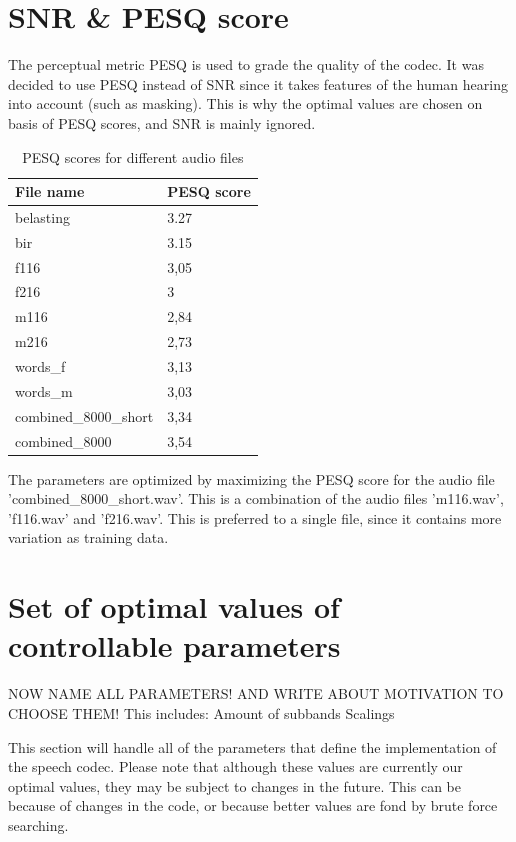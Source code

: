 \documentclass[a4paper]{article}
\begin{document}
\section{SNR \& PESQ score}
The perceptual metric PESQ is used to grade the quality of the codec. It was decided to use PESQ instead of SNR since it takes features of the human hearing into account (such as masking). This is why the optimal values are chosen on basis of PESQ scores, and SNR is mainly ignored. \\

\begin{table}[bth]
\begin{center}
\begin{tabular}{ |l|l| }
  \hline
  File name & PESQ score \\
  \hline
  belasting & 3.27 \\
  bir & 3.15 \\
  f116 & 3,05 \\
  f216 & 3 \\
  m116 & 2,84 \\
  m216 & 2,73 \\
  words\_f & 3,13 \\
  words\_m & 3,03 \\
  combined\_8000\_short & 3,34 \\
  combined\_8000 & 3,54 \\
  \hline
\end{tabular}
  \caption{PESQ scores for different audio files}
\label{fig:pesqscores}

\end{center}
\end{table}

The parameters are optimized by maximizing the PESQ score for the audio file 'combined\_8000\_short.wav'. This is a combination of the audio files 'm116.wav', 'f116.wav' and 'f216.wav'. This is preferred to a single file, since it contains more variation as training data.

\section{Set of optimal values of controllable parameters}
NOW NAME ALL PARAMETERS! AND WRITE ABOUT MOTIVATION TO CHOOSE THEM! This includes:
Amount of subbands
Scalings

This section will handle all of the parameters that define the implementation of the speech codec. Please note that although these values are currently our optimal values, they may be subject to changes in the future. This can be because of changes in the code, or because better values are fond by brute force searching.
\end{document}
